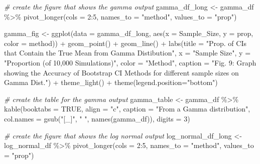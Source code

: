 \documentclass[12pt]{article}
\newenvironment{Shaded}{\begin{snugshade}}{\end{snugshade}}
\newcommand{\AttributeTok}[1]{\textcolor[rgb]{0.77,0.63,0.00}{#1}}
\newcommand{\CommentTok}[1]{\textcolor[rgb]{0.56,0.35,0.01}{\textit{#1}}}
\newcommand{\ConstantTok}[1]{\textcolor[rgb]{0.00,0.00,0.00}{#1}}
\newcommand{\DecValTok}[1]{\textcolor[rgb]{0.00,0.00,0.81}{#1}}
\newcommand{\FunctionTok}[1]{\textcolor[rgb]{0.00,0.00,0.00}{#1}}
\newcommand{\NormalTok}[1]{#1}
\newcommand{\OtherTok}[1]{\textcolor[rgb]{0.56,0.35,0.01}{#1}}
\newcommand{\SpecialCharTok}[1]{\textcolor[rgb]{0.00,0.00,0.00}{#1}}
\newcommand{\StringTok}[1]{\textcolor[rgb]{0.31,0.60,0.02}{#1}}
\begin{document}
\begin{Shaded}
\begin{Highlighting}[]
\CommentTok{\# create the figure that shows the gamma output}
\NormalTok{gamma\_df\_long }\OtherTok{\textless{}{-}}\NormalTok{ gamma\_df }\SpecialCharTok{\%\textgreater{}\%}
  \FunctionTok{pivot\_longer}\NormalTok{(}\AttributeTok{cols =} \DecValTok{2}\SpecialCharTok{:}\DecValTok{5}\NormalTok{, }\AttributeTok{names\_to =} \StringTok{"method"}\NormalTok{, }\AttributeTok{values\_to =} \StringTok{"prop"}\NormalTok{) }
    
\NormalTok{gamma\_fig }\OtherTok{\textless{}{-}} \FunctionTok{ggplot}\NormalTok{(}\AttributeTok{data =}\NormalTok{ gamma\_df\_long, }
                    \FunctionTok{aes}\NormalTok{(}\AttributeTok{x =}\NormalTok{ Sample\_Size, }\AttributeTok{y =}\NormalTok{ prop, }\AttributeTok{color =}\NormalTok{ method)) }\SpecialCharTok{+} 
  \FunctionTok{geom\_point}\NormalTok{() }\SpecialCharTok{+} \FunctionTok{geom\_line}\NormalTok{() }\SpecialCharTok{+} 
  \FunctionTok{labs}\NormalTok{(}\AttributeTok{title =} \StringTok{"Prop. of CIs that Contain the True Mean from Gamma Distibution"}\NormalTok{, }
       \AttributeTok{x =} \StringTok{"Sample Size"}\NormalTok{, }
       \AttributeTok{y =} \StringTok{"Proportion (of 10,000 Simulations)"}\NormalTok{, }\AttributeTok{color =} \StringTok{"Method"}\NormalTok{,}
       \AttributeTok{caption =} \StringTok{"Fig. 9: Graph showing the Accuracy of Bootstrap CI Methods for }
\StringTok{       different sample sizes on Gamma Dist."}\NormalTok{) }\SpecialCharTok{+}
  \FunctionTok{theme\_light}\NormalTok{() }\SpecialCharTok{+}
  \FunctionTok{theme}\NormalTok{(}\AttributeTok{legend.position=}\StringTok{"bottom"}\NormalTok{)}

\CommentTok{\# create the table for the gamma output}
\NormalTok{gamma\_table }\OtherTok{\textless{}{-}}\NormalTok{ gamma\_df }\SpecialCharTok{\%\textgreater{}\%}
  \FunctionTok{kable}\NormalTok{(}\AttributeTok{booktabs =} \ConstantTok{TRUE}\NormalTok{, }\AttributeTok{align =} \StringTok{"c"}\NormalTok{, }
        \AttributeTok{caption =} \StringTok{"From a Gamma distribution"}\NormalTok{, }
        \AttributeTok{col.names =} \FunctionTok{gsub}\NormalTok{(}\StringTok{"[\_]"}\NormalTok{, }\StringTok{" "}\NormalTok{, }\FunctionTok{names}\NormalTok{(gamma\_df)), }\AttributeTok{digits =} \DecValTok{3}\NormalTok{) }
   
\CommentTok{\# create the figure that shows the log normal output}
\NormalTok{log\_normal\_df\_long }\OtherTok{\textless{}{-}}\NormalTok{ log\_normal\_df }\SpecialCharTok{\%\textgreater{}\%}
  \FunctionTok{pivot\_longer}\NormalTok{(}\AttributeTok{cols =} \DecValTok{2}\SpecialCharTok{:}\DecValTok{5}\NormalTok{, }\AttributeTok{names\_to =} \StringTok{"method"}\NormalTok{, }\AttributeTok{values\_to =} \StringTok{"prop"}\NormalTok{) }
    

\end{Highlighting}
\end{Shaded}
\end{document}
